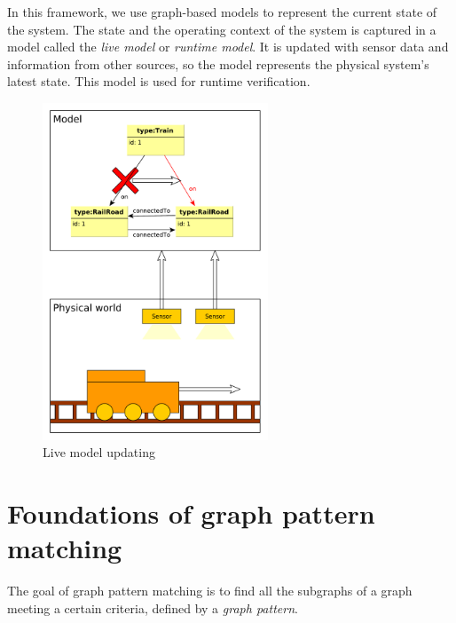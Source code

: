 In this framework, we use graph-based models to represent the current state of the system. 
The state and the operating context of the system is captured in a model called the \emph{live model} or \emph{runtime model}.
It is updated with sensor data and information from other sources, so the model represents the physical system's latest state. 
This model is used for runtime verification.


\begin{figure}[H]
	\begin{center}
		\includegraphics[width=0.6\textwidth]{figures/live-models.pdf}
		\caption{Live model updating}
		\label{fig:live-models}
	\end{center}
\end{figure}

\section{Foundations of graph pattern matching}
\label{section:gpmc}


The goal of graph pattern matching is to find all the subgraphs of a graph meeting a certain criteria, defined by a \emph{graph pattern}.

